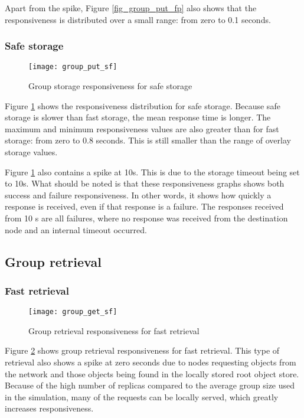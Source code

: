 Apart from the spike, Figure \ref{fig_group_put_fp} also shows that the responsiveness is distributed over a small range: from zero to 0.1 seconds.

\subsubsection{Safe storage}
\begin{figure}[htbp]
 \centering
 \texttt{[image: group\_put\_sf]}
 \caption{Group storage responsiveness for safe storage}
 \label{fig_group_put_sf}
\end{figure}
%
Figure \ref{fig_group_put_sf} shows the responsiveness distribution for safe storage. Because safe storage is slower than fast storage, the mean response time is longer. The maximum and minimum responsiveness values are also greater than for fast storage: from zero to 0.8 seconds. This is still smaller than the range of overlay storage values.

Figure \ref{fig_group_put_sf} also contains a spike at 10s. This is due to the storage timeout being set to 10s. What should be noted is that these responsiveness graphs shows both success and failure responsiveness. In other words, it shows how quickly a response is received, even if that response is a failure. The responses received from 10 s are all failures, where no response was received from the destination node and an internal timeout occurred.

\subsection{Group retrieval}
\subsubsection{Fast retrieval}
\begin{figure}[htbp]
 \centering
 \texttt{[image: group\_get\_sf]}
 \caption{Group retrieval responsiveness for fast retrieval}
 \label{fig_group_get_sf}
\end{figure}
%
Figure \ref{fig_group_get_sf} shows group retrieval responsiveness for fast retrieval. This type of retrieval also shows a spike at zero seconds due to nodes requesting objects from the network and those objects being found in the locally stored root object store. Because of the high number of replicas compared to the average group size used in the simulation, many of the requests can be locally served, which greatly increases responsiveness.

